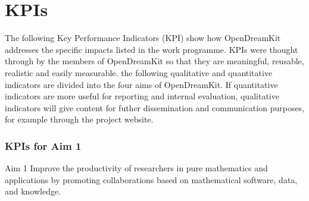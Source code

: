 
\section{KPIs}

\begin{introduction}The following Key Performance Indicators (KPI) show how OpenDreamKit addresses the specific impacts listed in the work 
programme. KPIs were thought through by the members of OpenDreamKit so that they are meaningful, reusable, realistic and easily measurable. 
the following qualitative and quantitative indicators are divided into the four aims of OpenDreamKit. If quantitative indicators are more 
useful for reporting and internal evaluation, qualitative indicators will give content for futher dissemination and communication purposes, 
for example through the project website.
\end{introduction}


\subsubsection{KPIs for Aim 1}

\begin{recommendation}{Aim 1} Improve the productivity of researchers in pure mathematics and applications by promoting collaborations based 
on mathematical software, data, and knowledge.\end{recommendation}


